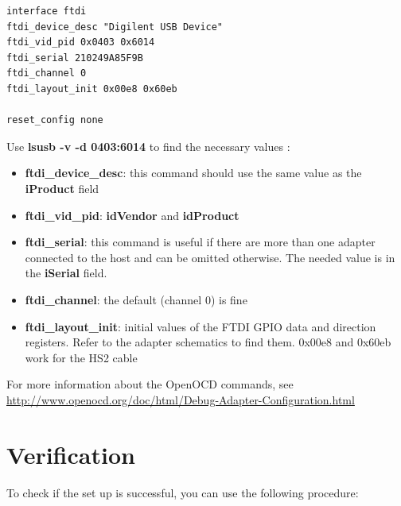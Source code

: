 \documentclass{article}
\begin{document}
	\begin{lstlisting}
interface ftdi
ftdi_device_desc "Digilent USB Device"
ftdi_vid_pid 0x0403 0x6014
ftdi_serial 210249A85F9B
ftdi_channel 0						
ftdi_layout_init 0x00e8 0x60eb

reset_config none
    \end{lstlisting}
    
    Use \textbf{lsusb -v -d 0403:6014} to find the necessary values :
    
    \vspace{-\topsep}
	\begin{itemize}
	\item \textbf{ftdi\_device\_desc}: this command should use the same value as the \textbf{iProduct} field
	
	\item \textbf{ftdi\_vid\_pid}: \textbf{idVendor} and \textbf{idProduct}
	
	\item \textbf{ftdi\_serial}: this command is useful if there are more than one adapter connected to the host and can be omitted otherwise. The needed value is in the \textbf{iSerial} field.
	
	\item \textbf{ftdi\_channel}: the default (channel 0) is fine
	
	\item \textbf{ftdi\_layout\_init}: initial values of the FTDI GPIO data and direction registers. Refer to the adapter schematics to find them. 0x00e8 and 0x60eb work for the HS2 cable
	\end{itemize}
	
	For more information about the OpenOCD commands, see \url{http://www.openocd.org/doc/html/Debug-Adapter-Configuration.html}
	
	\newpage
	\section{Verification}
	
	To check if the set up is successful, you can use the following procedure:
	
\end{document}
